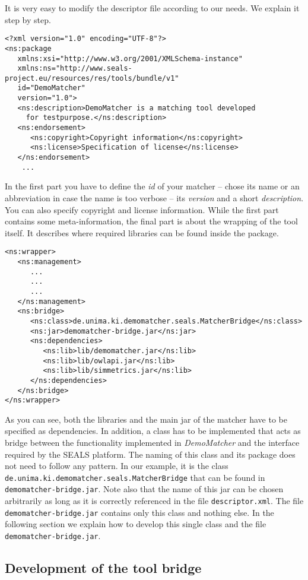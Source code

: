 \documentclass{article}
\def\file#1{\textcolor{grayy}{\texttt{#1}}}
\def\tool#1{\textsl{#1}}
\begin{document}
It is very easy to modify the descriptor file according to our needs. We explain it step by step.
\begin{verbatim}
<?xml version="1.0" encoding="UTF-8"?>
<ns:package 	  
   xmlns:xsi="http://www.w3.org/2001/XMLSchema-instance" 
   xmlns:ns="http://www.seals-project.eu/resources/res/tools/bundle/v1"
   id="DemoMatcher" 
   version="1.0">
   <ns:description>DemoMatcher is a matching tool developed
     for testpurpose.</ns:description>
   <ns:endorsement>
      <ns:copyright>Copyright information</ns:copyright>
      <ns:license>Specification of license</ns:license>
   </ns:endorsement>
	...
\end{verbatim}
In the first part you have to define the \emph{id} of your matcher -- chose its name or an abbreviation in case the name is too verbose -- its \emph{version} and a short \emph{description}. You can also specify copyright and license information. While the first part contains some meta-information, the final part is about the wrapping of the tool itself. It describes where required libraries can be found inside the package.
\begin{verbatim}
<ns:wrapper>
   <ns:management>
      ...
      ...
      ...
   </ns:management>
   <ns:bridge>
      <ns:class>de.unima.ki.demomatcher.seals.MatcherBridge</ns:class>
      <ns:jar>demomatcher-bridge.jar</ns:jar>
      <ns:dependencies>
         <ns:lib>lib/demomatcher.jar</ns:lib>
         <ns:lib>lib/owlapi.jar</ns:lib>
         <ns:lib>lib/simmetrics.jar</ns:lib>
      </ns:dependencies>
   </ns:bridge>
</ns:wrapper>
\end{verbatim}
As you can see, both the libraries and the main jar of the matcher have to be specified as dependencies. In addition, a class has to be implemented that acts as bridge between the functionality implemented in \tool{DemoMatcher} and the interface required by the SEALS platform. The naming of this class and its package does not need to follow any pattern. In our example, it is the class \verb|de.unima.ki.demomatcher.seals.MatcherBridge| that can be found in \file{demomatcher-bridge.jar}. Note also that the name of this jar can be chosen arbitrarily as long as it is correctly referenced in the file \file{descriptor.xml}.  The file \file{demomatcher-bridge.jar} contains only this class and nothing else. In the following section we explain how to develop this single class and the file \file{demomatcher-bridge.jar}.


\subsection{Development of the tool bridge}
\label{sec:toolbridge}
\end{document}
